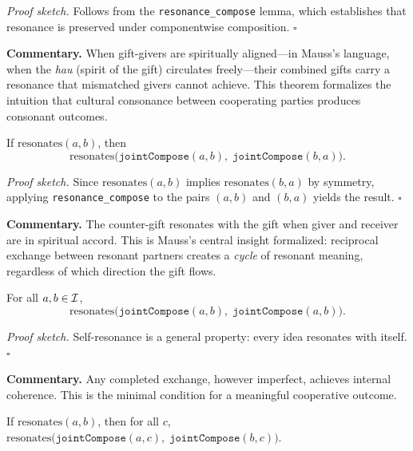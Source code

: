 \noindent\textit{Proof sketch.}\quad
Follows from the \texttt{resonance\_compose} lemma, which establishes
that resonance is preserved under componentwise composition.
\hfill$\square$

\medskip

\noindent\textbf{Commentary.}
When gift-givers are spiritually aligned---in Mauss's language, when the
\textit{hau} (spirit of the gift) circulates freely---their combined gifts
carry a resonance that mismatched givers cannot achieve.  This theorem
formalizes the intuition that cultural consonance between cooperating parties
produces consonant outcomes.

\begin{theorem}
\label{thm:reciprocal_resonance}
If $\text{resonates}(a, b)$, then
\[
  \text{resonates}\bigl(\texttt{jointCompose}(a, b),\;
  \texttt{jointCompose}(b, a)\bigr).
\]
\end{theorem}

\noindent\textit{Proof sketch.}\quad
Since $\text{resonates}(a, b)$ implies $\text{resonates}(b, a)$ by
symmetry, applying \texttt{resonance\_compose} to the pairs
$(a, b)$ and $(b, a)$ yields the result.
\hfill$\square$

\medskip

\noindent\textbf{Commentary.}
The counter-gift resonates with the gift when giver and receiver are in
spiritual accord.  This is Mauss's central insight formalized: reciprocal
exchange between resonant partners creates a \emph{cycle} of resonant
meaning, regardless of which direction the gift flows.

\begin{theorem}
\label{thm:joint_self_resonance}
For all $a, b \in \mathcal{I}$,
\[
  \text{resonates}\bigl(\texttt{jointCompose}(a, b),\;
  \texttt{jointCompose}(a, b)\bigr).
\]
\end{theorem}

\noindent\textit{Proof sketch.}\quad
Self-resonance is a general property: every idea resonates with itself.
\hfill$\square$

\medskip

\noindent\textbf{Commentary.}
Any completed exchange, however imperfect, achieves internal coherence.
This is the minimal condition for a meaningful cooperative outcome.

\begin{theorem}
\label{thm:joint_resonance_right}
If $\text{resonates}(a, b)$, then for all $c$,
$\text{resonates}\bigl(\texttt{jointCompose}(a, c),\; \texttt{jointCompose}(b, c)\bigr)$.
\end{theorem}

